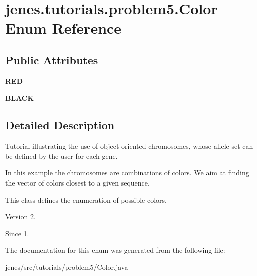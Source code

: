 \hypertarget{enumjenes_1_1tutorials_1_1problem5_1_1_color}{\section{jenes.\-tutorials.\-problem5.\-Color Enum Reference}
\label{enumjenes_1_1tutorials_1_1problem5_1_1_color}
}
\subsection*{Public Attributes}
\begin{DoxyCompactItemize}
\item 
\hypertarget{enumjenes_1_1tutorials_1_1problem5_1_1_color_a820ec36787044c1681e2768b18a4a38e}{{\bfseries R\-E\-D}}\label{enumjenes_1_1tutorials_1_1problem5_1_1_color_a820ec36787044c1681e2768b18a4a38e}

\item 
\hypertarget{enumjenes_1_1tutorials_1_1problem5_1_1_color_a6628df3180f62635a91cb1cd749af195}{{\bfseries B\-L\-A\-C\-K}}\label{enumjenes_1_1tutorials_1_1problem5_1_1_color_a6628df3180f62635a91cb1cd749af195}

\end{DoxyCompactItemize}


\subsection{Detailed Description}
Tutorial illustrating the use of object-\/oriented chromosomes, whose allele set can be defined by the user for each gene.

In this example the chromosomes are combinations of colors. We aim at finding the vector of colors closest to a given sequence.

This class defines the enumeration of possible colors.

\begin{DoxyVersion}{Version}
2. 
\end{DoxyVersion}
\begin{DoxySince}{Since}
1. 
\end{DoxySince}


The documentation for this enum was generated from the following file\-:\begin{DoxyCompactItemize}
\item 
jenes/src/tutorials/problem5/Color.\-java\end{DoxyCompactItemize}
